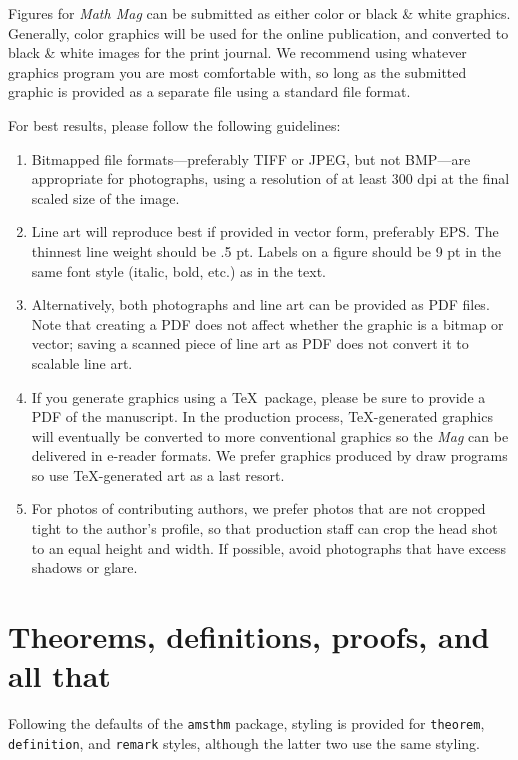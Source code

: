 \documentclass{article}
\theoremstyle{definition}
\begin{document}
Figures for  \textit{Math Mag} can be submitted as either color or black \& white graphics.  Generally, color graphics will be used for the online publication, and converted to black \& white images for the print journal.  We recommend using whatever graphics program you are most comfortable with, so long as the submitted graphic is provided as a separate file using a standard file format.

For best results, please follow the following guidelines:
\begin{enumerate}
\item Bitmapped file formats---preferably TIFF or JPEG, but not BMP---are appropriate for photographs, using a resolution of at least 300 dpi at the final scaled size of the image.
\item Line art will reproduce best if provided in vector form, preferably EPS. The thinnest line weight should be .5 pt.  Labels on a figure should be 9 pt in the same font style (italic, bold, etc.) as in the text.
\item Alternatively, both photographs and line art can be provided as PDF files.  Note that creating a PDF does not affect whether the graphic is a bitmap or vector; saving a scanned piece of line art as PDF does not convert it to scalable line art.
\item If you generate graphics using a \TeX\ package, please be sure to provide a PDF of the manuscript.  In the production process, \TeX-generated graphics will eventually be converted to more conventional graphics so the \textit{Mag} can be delivered in e-reader formats.  We prefer graphics produced by draw programs so use \TeX-generated art as a last resort.
\item For photos of contributing authors, we prefer photos that are not cropped tight to the author's profile, so that production staff can crop the head shot to an equal height and width.  If possible, avoid photographs that have excess shadows or glare.
\end{enumerate}



\section{Theorems, definitions, proofs, and all that}

Following the defaults of the \texttt{amsthm} package, styling is provided for \texttt{theorem}, \texttt{definition}, and \texttt{remark} styles, although the latter two use the same styling.
\end{document}
